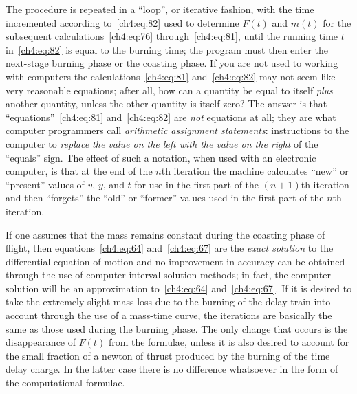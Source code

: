 The procedure is repeated in a ``loop'', or iterative fashion, with the time incremented according
to~\eqref{ch4:eq:82} used to determine $F(t)$ and $m(t)$ for the subsequent calculations~\eqref{ch4:eq:76}
through~\eqref{ch4:eq:81}, until the running time $t$ in~\eqref{ch4:eq:82} is equal to the burning time;
the program must then enter the next-stage burning phase or the coasting phase. If you are not used to
working with computers the calculations~\eqref{ch4:eq:81} and~\eqref{ch4:eq:82} may not seem like very
reasonable equations; after all, how can a quantity be equal to itself \emph{plus} another quantity, unless
the other quantity is itself zero? The answer is that ``equations''~\eqref{ch4:eq:81}
and~\eqref{ch4:eq:82} are \emph{not} equations at all; they are what computer programmers call
\emph{arithmetic assignment statements}: instructions to the computer to \emph{replace the value on the
left with the value on the right} of the ``equals'' sign. The effect of such a notation, when used with an
electronic computer, is that at the end of the $n$th iteration the machine calculates ``new'' or
``present'' values of $v$, $y$, and $t$ for use in the first part of the $(n + 1)$th iteration and then
``forgets'' the ``old'' or ``former'' values used in the first part of the $n$th iteration.

If one assumes that the mass remains constant during the coasting phase of flight, then
equations~\eqref{ch4:eq:64} and~\eqref{ch4:eq:67} are the \emph{exact solution} to the differential
equation of motion and no improvement in accuracy can be obtained through the use of computer interval
solution methods; in fact, the computer solution will be an approximation to~\eqref{ch4:eq:64}
and~\eqref{ch4:eq:67}. If it is desired to take the extremely slight mass loss due to the burning of the
delay train into account through the use of a mass-time curve, the iterations are basically the same as
those used during the burning phase. The only change that occurs is the disappearance of $F(t)$ from the
formulae, unless it is also desired to account for the small fraction of a newton of thrust produced by the
burning of the time delay charge. In the latter case there is no difference whatsoever in the form of the
computational formulae.

